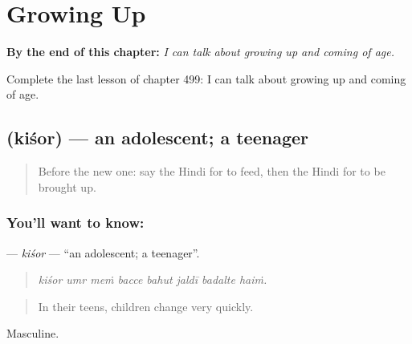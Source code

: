 
\chapter{Growing Up}
\label{ch:hi-growing-up}

\begin{chapteropening}
\textbf{By the end of this chapter:} \emph{I can talk about growing up and coming of age.}

Complete the last lesson of chapter 499: I can talk about growing up and coming of age.
\end{chapteropening}

\section[\texorpdfstring{\hi{किशोर} (kiśor)}{किशोर (kiśor)}]{ (kiśor) — an adolescent; a teenager}

\label{lesson:HI-C499-kisor}



\begin{quote}
Before the new one: say the Hindi for to feed, then the Hindi for to be brought up.
\end{quote}

\subsection*{You'll want to know: }
\textbf{} — \emph{kiśor} — \textquotedblleft{}an adolescent; a teenager\textquotedblright{}.

\begin{quote}
       
\end{quote}

\begin{quote}
\emph{kiśor umr meṁ bacce bahut jaldī badalte haiṁ.}
\end{quote}

\begin{quote}
In their teens, children change very quickly.
\end{quote}

Masculine.

